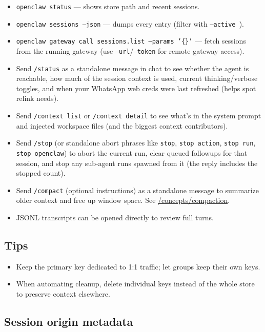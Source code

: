 \begin{itemize}
  \item \texttt{openclaw status} — shows store path and recent sessions.
  \item \texttt{openclaw sessions --json} — dumps every entry (filter with \texttt{--active }).
  \item \texttt{openclaw gateway call sessions.list --params '\{\}'} — fetch sessions from the running gateway (use \texttt{--url}/\texttt{--token} for remote gateway access).
  \item Send \texttt{/status} as a standalone message in chat to see whether the agent is reachable, how much of the session context is used, current thinking/verbose toggles, and when your WhatsApp web creds were last refreshed (helps spot relink needs).
  \item Send \texttt{/context list} or \texttt{/context detail} to see what’s in the system prompt and injected workspace files (and the biggest context contributors).
  \item Send \texttt{/stop} (or standalone abort phrases like \texttt{stop}, \texttt{stop action}, \texttt{stop run}, \texttt{stop openclaw}) to abort the current run, clear queued followups for that session, and stop any sub-agent runs spawned from it (the reply includes the stopped count).
  \item Send \texttt{/compact} (optional instructions) as a standalone message to summarize older context and free up window space. See \href{/concepts/compaction}{/concepts/compaction}.
  \item JSONL transcripts can be opened directly to review full turns.
\end{itemize}


\subsection{Tips}


\begin{itemize}
  \item Keep the primary key dedicated to 1:1 traffic; let groups keep their own keys.
  \item When automating cleanup, delete individual keys instead of the whole store to preserve context elsewhere.
\end{itemize}


\subsection{Session origin metadata}


